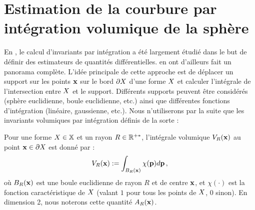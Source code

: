 \section{Estimation de la courbure par intégration volumique de la sphère}
\label{sec:estimators:volume}
%
En \GeometryProcessing, le calcul d'invariants par intégration a été largement
étudié dans le but de définir des estimateurs de quantités différentielles.
 en ont d'ailleurs fait un
panorama complète. L'idée principale de cette approche est de déplacer un support
sur les points $\mathbf{x}$ sur le bord $\partial X$ d'une forme $X$ et calculer
l'intégrale de l'intersection entre $X$ et le support. Différents supports
peuvent être considérés (sphère euclidienne, boule euclidienne, etc.) ainsi que
différentes fonctions d'intégration (linéaire, gaussienne, etc.). Nous
n'utiliserons par la suite que les invariants volumiques par intégration définis
de la sorte :
%
\begin{definition}
  \label{def:Volume}
  Pour une forme $X \in \mathbb{X}$ et un rayon $R \in \mathbb{R}^{+*}$, l'intégrale
  volumique $V_R(\mathbf{x})$ au point $\mathbf{x} \in \partial X$ est donné par :
  \begin{equation}
    V_R(\mathbf{x}) := \int_{B_{R}(\mathbf{x})} \chi(\mathbf{p})d\mathbf{p}\,,
  \end{equation}
  où $B_{R}(\mathbf{x})$ est une boule euclidienne de rayon $R$ et de centre $\mathbf{x}$,
  et $\chi(\cdot)$ est la fonction caractéristique de $X$ (valant $1$ pour
  tous les points de $X$, $0$ sinon). En dimension 2, nous noterons cette
  quantité $A_R(\mathbf{x})$.
\end{definition}
%
